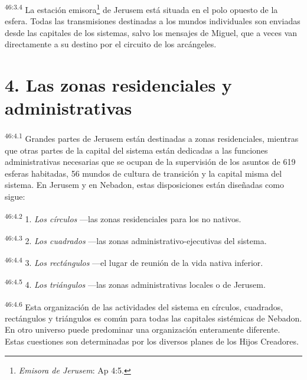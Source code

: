 \par
\textsuperscript{46:3.4} La estación emisora\footnote{\textit{Emisora de Jerusem}: Ap 4:5.} de Jerusem está situada en el polo opuesto de la esfera. Todas las transmisiones destinadas a los mundos individuales son enviadas desde las capitales de los sistemas, salvo los mensajes de Miguel, que a veces van directamente a su destino por el circuito de los arcángeles.

\section*{4. Las zonas residenciales y administrativas}
\par
\textsuperscript{46:4.1} Grandes partes de Jerusem están destinadas a zonas residenciales, mientras que otras partes de la capital del sistema están dedicadas a las funciones administrativas necesarias que se ocupan de la supervisión de los asuntos de 619 esferas habitadas, 56 mundos de cultura de transición y la capital misma del sistema. En Jerusem y en Nebadon, estas disposiciones están diseñadas como sigue:

\par
\textsuperscript{46:4.2} 1. \textit{Los círculos} ---las zonas residenciales para los no nativos.

\par
\textsuperscript{46:4.3} 2. \textit{Los cuadrados} ---las zonas administrativo-ejecutivas del sistema.

\par
\textsuperscript{46:4.4} 3. \textit{Los rectángulos} ---el lugar de reunión de la vida nativa inferior.

\par
\textsuperscript{46:4.5} 4. \textit{Los triángulos} ---las zonas administrativas locales o de Jerusem.

\par
\textsuperscript{46:4.6} Esta organización de las actividades del sistema en círculos, cuadrados, rectángulos y triángulos es común para todas las capitales sistémicas de Nebadon. En otro universo puede predominar una organización enteramente diferente. Estas cuestiones son determinadas por los diversos planes de los Hijos Creadores.


